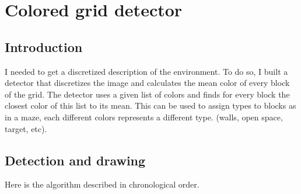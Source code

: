 \section{Colored grid detector}
\label{sec:cgd}

\subsection{Introduction}
\label{sec:cgd:intro}
I needed to get a discretized description of the environment. To do so, 
I built a detector that discretizes the image and calculates the mean 
color of every block of the grid. The detector uses a given list of 
colors and finds for every block the closest color of this list to its 
mean. This can be used to assign types to blocks as in a maze, each 
different colors represents a different type. (walls, open space, 
target, etc).

\subsection{Detection and drawing}
\label{sec:cgd:algo}
Here is the algorithm described in chronological order.

